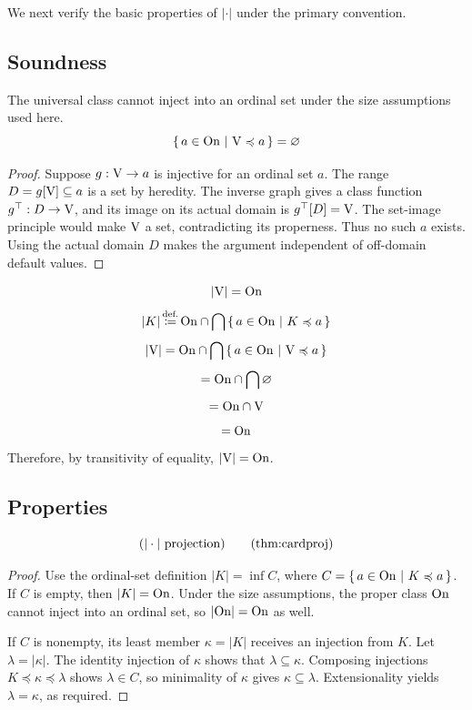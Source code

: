 We next verify the basic properties of $| \cdot |$ under the primary convention.

\subsection{Soundness}
\begin{lemma}
The universal class cannot inject into an ordinal set under the size assumptions used here.
\[
\left\{\,a\in\mathrm{On}\ \middle|\ \mathrm{V}\preccurlyeq a\,\right\}
=
\varnothing
\]
\end{lemma}
\begin{proof}
Suppose $g:\mathrm{V}\to a$ is injective for an ordinal set $a$. The range
$D=g[\mathrm{V}]\subseteq a$ is a set by heredity. The inverse graph gives a
class function $g^\top:D\to\mathrm{V}$, and its image on its actual domain is
$g^\top[D]=\mathrm{V}$. The set-image principle would make $\mathrm{V}$ a set,
contradicting its properness. Thus no such $a$ exists. Using the actual
domain $D$ makes the argument independent of off-domain default values.
\end{proof}
\begin{theorem}
\[
|\mathrm{V}|=\mathrm{On}
\]
\Proof
\[
|K|\,{\stackrel{{\textrm{def.}}}{\coloneqq}}\, \mathrm{On} \cap \bigcap \left\{\,a\in\mathrm{On}\ \middle|\ K\preccurlyeq a\,\right\}
\]
\[
|\mathrm{V}|= \mathrm{On} \cap \bigcap \left\{\,a\in\mathrm{On}\ \middle|\ \mathrm{V}\preccurlyeq a\,\right\}
\]
\[
= \mathrm{On} \cap \bigcap \varnothing
\]
\[
= \mathrm{On} \cap \mathrm{V}
\]
\[
= \mathrm{On}
\]
Therefore, by transitivity of equality, $|\mathrm{V}|=\mathrm{On}$.
\iffalse
Original:
\[
(A\text{ nonset})
\iff
(
\exists F,\ (
(F\text{ class--functional})
\land
(\V\subclass F[A])
)
)
\ctagd{axm}{limitation of size}
\]
New? no need: is it ok? not really: extended def of function! It doesn't  matter since nonsests are not in $F[A]$ anyway.
\[
(A\text{ nonset})
\iff
(
\exists G,\ (
(G\text{ class--injective})
\land
(\V\subclass G^\top[A])
)
)
\ctagd{axm}{limitation of size}
\]
\[
(T\text{ class--functional})
\iff
(T^\top\text{ class--injective})
\]
\fi

\Done
\end{theorem}
\subsection{Properties}
\begin{theorem}
\[
(|\cdot|\text{ projection})
\labeltagd{thm}{cardproj}
\]
\end{theorem}
\begin{proof}
Use the ordinal-set definition
$|K|=\inf C$, where $C=\left\{\,a\in\mathrm{On}\ \middle|\ K\preccurlyeq a\,\right\}$.
If $C$ is empty, then $|K|=\mathrm{On}$. Under the size assumptions, the proper
class $\mathrm{On}$ cannot inject into an ordinal set, so $|\mathrm{On}|=\mathrm{On}$ as well.

If $C$ is nonempty, its least member $\kappa=|K|$ receives an injection
from $K$. Let $\lambda=|\kappa|$. The identity injection of $\kappa$
shows that $\lambda\subseteq\kappa$. Composing injections
$K\preccurlyeq\kappa\preccurlyeq\lambda$ shows $\lambda\in C$,
so minimality of $\kappa$ gives $\kappa\subseteq\lambda$.
Extensionality yields $\lambda=\kappa$, as required.
\end{proof}



